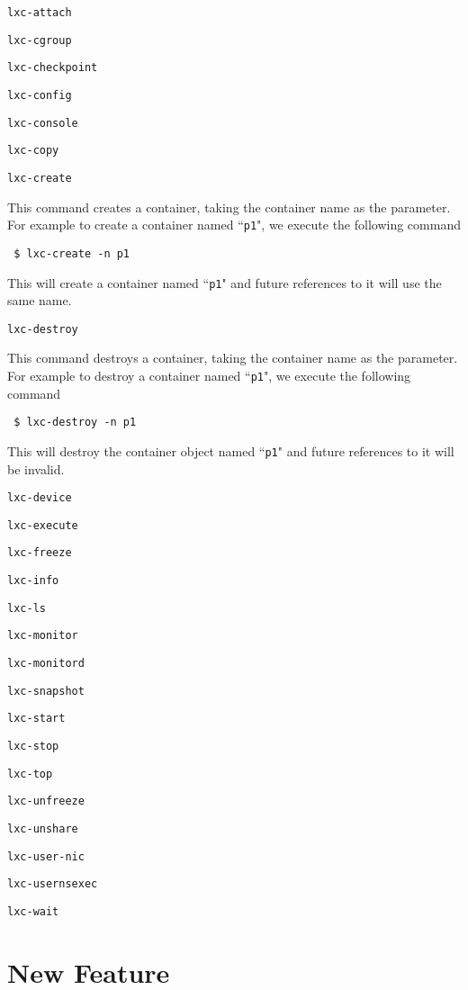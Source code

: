 \documentclass[12pt]{article}
\begin{document}
{\parindent0pt %

\texttt{lxc-attach}

\texttt{lxc-cgroup}

\texttt{lxc-checkpoint}

\texttt{lxc-config}

\texttt{lxc-console}

\texttt{lxc-copy}

\texttt{lxc-create}
\begin{dent}
This command creates a container, taking the container name as the parameter. For example to create a container named ``\texttt{p1}", we execute the following command

\texttt{ \$ lxc-create -n p1}

This will create a container named ``\texttt{p1}" and future references to it will use the same name.
\end{dent}

\texttt{lxc-destroy}
\begin{dent}
This command destroys a container, taking the container name as the parameter. For example to destroy a container named ``\texttt{p1}", we execute the following command

\texttt{ \$ lxc-destroy -n p1}

This will destroy the container object named ``\texttt{p1}" and future references to it will be invalid.
\end{dent}

\texttt{lxc-device}

\texttt{lxc-execute}

\texttt{lxc-freeze}

\texttt{lxc-info}

\texttt{lxc-ls}

\texttt{lxc-monitor}

\texttt{lxc-monitord}

\texttt{lxc-snapshot}

\texttt{lxc-start}



\texttt{lxc-stop}

\texttt{lxc-top}

\texttt{lxc-unfreeze}

\texttt{lxc-unshare}

\texttt{lxc-user-nic}

\texttt{lxc-usernsexec}

\texttt{lxc-wait}

} %


\section{New Feature}
\end{document}
